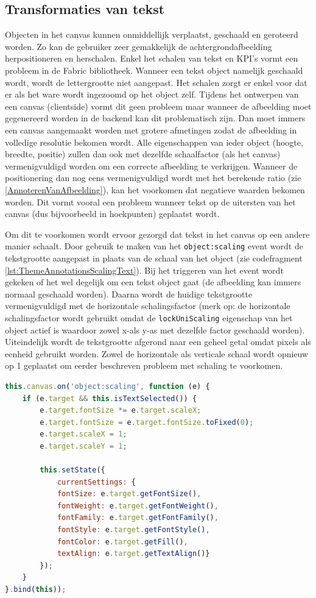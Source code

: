 \subsection{Transformaties van tekst}
Objecten in het canvas kunnen onmiddellijk verplaatst, geschaald en geroteerd worden. Zo kan de gebruiker zeer gemakkelijk de achtergrondafbeelding herpositioneren en herschalen. Enkel het schalen van tekst en KPI's vormt een probleem in de Fabric bibliotheek. Wanneer een tekst object namelijk geschaald wordt, wordt de lettergrootte niet aangepast. Het schalen zorgt er enkel voor dat er als het ware wordt ingezoomd op het object zelf. Tijdens het ontwerpen van een canvas (clientside) vormt dit geen probleem maar wanneer de afbeelding moet gegenereerd worden in de backend kan dit problematisch zijn. Dan moet immers een canvas aangemaakt worden met grotere afmetingen zodat de afbeelding in volledige resolutie bekomen wordt.  Alle eigenschappen van ieder object (hoogte, breedte, positie) zullen dan ook met dezelfde schaalfactor (als het canvas) vermenigvuldigd worden om een correcte afbeelding te verkrijgen. Wanneer de positionering dan nog eens vermenigvuldigd wordt met het berekende ratio (zie \ref{AnnoterenVanAfbeelding}), kan het voorkomen dat negatieve waarden bekomen worden. Dit vormt vooral een probleem wanneer tekst op de uitersten van het canvas (dus bijvoorbeeld in hoekpunten) geplaatst wordt. 

Om dit te voorkomen wordt ervoor gezorgd dat tekst in het canvas op een andere manier schaalt. Door gebruik te maken van het \texttt{object:scaling} event wordt de tekstgrootte aangepast in plaats van de schaal van het object (zie codefragment \ref{lst:ThemeAnnotationsScalingText}). Bij het triggeren van het event wordt gekeken of het wel degelijk om een tekst object gaat (de afbeelding kan immers normaal geschaald worden). Daarna wordt de huidige tekstgrootte vermenigvuldigd met de horizontale schalingsfactor (merk op: de horizontale schalingsfactor wordt gebruikt omdat de \texttt{lockUniScaling} eigenschap van het object actief is waardoor zowel x-als y-as met dezelfde factor geschaald worden). Uiteindelijk wordt de tekstgrootte afgerond naar een geheel getal omdat pixels als eenheid gebruikt worden. Zowel de horizontale als verticale schaal wordt opnieuw op 1 geplaatst om eerder beschreven probleem met schaling te voorkomen. 

\begin{lstlisting}[caption={ThemeAnnotations component - text scaling},label=lst:ThemeAnnotationsScalingText,language=javascript]
this.canvas.on('object:scaling', function (e) {
	if (e.target && this.isTextSelected()) {
		e.target.fontSize *= e.target.scaleX;
		e.target.fontSize = e.target.fontSize.toFixed(0);
		e.target.scaleX = 1;
		e.target.scaleY = 1;
		
		this.setState({
			currentSettings: {
			fontSize: e.target.getFontSize(),
			fontWeight: e.target.getFontWeight(),
			fontFamily: e.target.getFontFamily(),
			fontStyle: e.target.getFontStyle(),
			fontColor: e.target.getFill(),
			textAlign: e.target.getTextAlign()}
		});
	}
}.bind(this));
\end{lstlisting}

